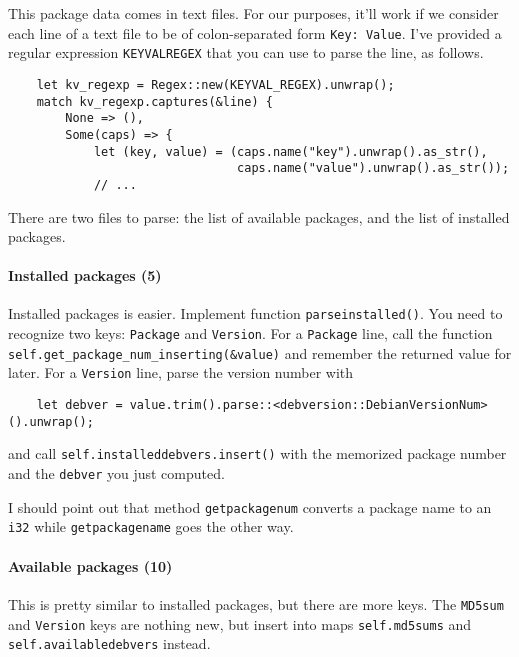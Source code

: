 \documentclass[12pt]{article}
\renewcommand{\_}{\kern-1.5pt\textunderscore\kern-1.5pt}
\begin{document}
\vspace{1em}
This package data comes in text files. For our purposes, it'll work if we consider each line of a text file to be of colon-separated form \verb+Key: Value+. I've provided a regular expression \texttt{KEYVAL\_REGEX} that you can use to parse the line, as follows.\par

\begin{verbatim}
    let kv_regexp = Regex::new(KEYVAL_REGEX).unwrap();
    match kv_regexp.captures(&line) {
        None => (),
        Some(caps) => {
            let (key, value) = (caps.name("key").unwrap().as_str(), 
                                caps.name("value").unwrap().as_str());
            // ...
\end{verbatim}

\vspace{1em}
There are two files to parse: the list of available packages, and the list of installed packages. 

\paragraph{Installed packages (5)} Installed packages is easier. Implement function \texttt{parse\_installed()}.
You need to recognize two keys: \texttt{Package} and \texttt{Version}. For a \texttt{Package} line, call 
the function \verb+self.get_package_num_inserting(&value)+ and remember the returned value for later. For a \texttt{Version} line,
parse the version number with
\begin{verbatim}
    let debver = value.trim().parse::<debversion::DebianVersionNum>().unwrap();
\end{verbatim}
and call \texttt{self.installed\_debvers.insert()} with the memorized package number and the \texttt{debver} you just computed.\par

I should point out that method \texttt{get\_package\_num} converts a package name to an \texttt{i32} while
\texttt{get\_package\_name} goes the other way.

\paragraph{Available packages (10)} This is pretty similar to installed packages, but there are more keys. 
The \texttt{MD5sum} and \texttt{Version} keys are nothing new, but insert into maps \texttt{self.md5sums} and \texttt{self.available\_debvers} instead.\par
\end{document}
